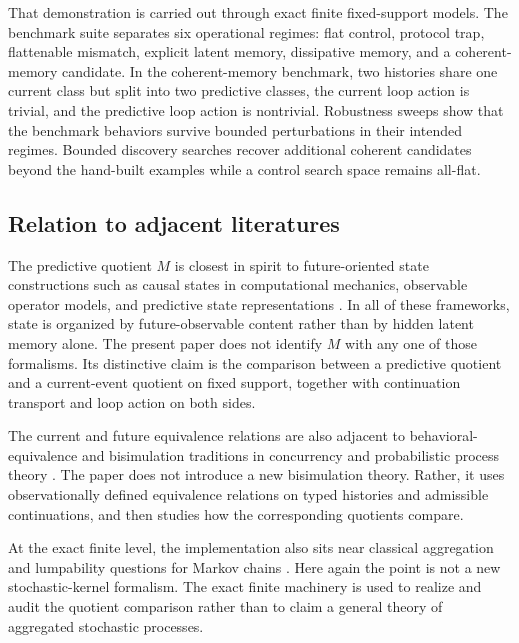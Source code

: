 \documentclass[11pt]{article}
\newcommand{\PredictiveQ}{M}
\theoremstyle{definition}
\begin{document}
That demonstration is carried out through exact finite fixed-support models. The benchmark suite separates six operational regimes: flat control, protocol trap, flattenable mismatch, explicit latent memory, dissipative memory, and a coherent-memory candidate. In the coherent-memory benchmark, two histories share one current class but split into two predictive classes, the current loop action is trivial, and the predictive loop action is nontrivial. Robustness sweeps show that the benchmark behaviors survive bounded perturbations in their intended regimes. Bounded discovery searches recover additional coherent candidates beyond the hand-built examples while a control search space remains all-flat.

\subsection{Relation to adjacent literatures}\label{subsec:intro-related}
The predictive quotient $\PredictiveQ$ is closest in spirit to future-oriented state constructions such as causal states in computational mechanics, observable operator models, and predictive state representations \citep{ShaliziCrutchfield2001ComputationalMechanics,Jaeger2000ObservableOperatorModels,LittmanSuttonSingh2002PredictiveRepresentationsState}. In all of these frameworks, state is organized by future-observable content rather than by hidden latent memory alone. The present paper does not identify $\PredictiveQ$ with any one of those formalisms. Its distinctive claim is the comparison between a predictive quotient and a current-event quotient on fixed support, together with continuation transport and loop action on both sides.

The current and future equivalence relations are also adjacent to behavioral-equivalence and bisimulation traditions in concurrency and probabilistic process theory \citep{Park1981ConcurrencyAutomata,Milner1989CommunicationConcurrency,LarsenSkou1991BisimulationThroughProbabilisticTesting}. The paper does not introduce a new bisimulation theory. Rather, it uses observationally defined equivalence relations on typed histories and admissible continuations, and then studies how the corresponding quotients compare.

At the exact finite level, the implementation also sits near classical aggregation and lumpability questions for Markov chains \citep{KemenySnell1976FiniteMarkovChains,Norris1998MarkovChains,Buchholz1994ExactOrdinaryLumpability}. Here again the point is not a new stochastic-kernel formalism. The exact finite machinery is used to realize and audit the quotient comparison rather than to claim a general theory of aggregated stochastic processes.
\end{document}
